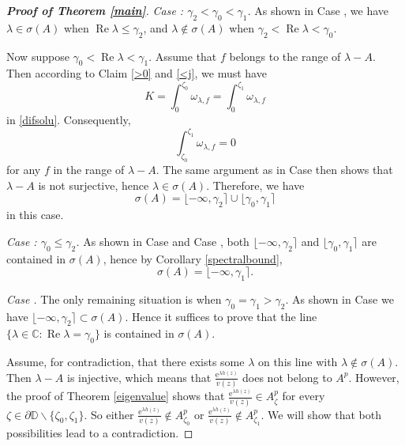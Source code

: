 \documentclass[10pt,a4paper]{amsart}
\begin{document}
\begin{proof}[\textbf{Proof of Theorem \ref{main}}]
\noindent\emph{ Case \uppercase\expandafter{}: $\gamma_2<\gamma_0<\gamma_1$.} As shown in Case \uppercase\expandafter{}, we have $\lambda\in\sigma(A)$ when $\operatorname{Re}\lambda\leq\gamma_2$, and $\lambda\notin\sigma(A)$ when $\gamma_2<\operatorname{Re}\lambda<\gamma_0$.

Now suppose $\gamma_0<\operatorname{Re}\lambda<\gamma_1$. Assume that $f$ belongs to the range of $\lambda-A$. Then according to Claim \ref{>0} and \ref{<j}, we must have
$$K=\int_0^{\zeta_0} \omega_{\lambda,f}=\int_0^{\zeta_1} \omega_{\lambda,f}$$
in \eqref{difsolu}. Consequently,
$$\int_{\zeta_0}^{\zeta_1} \omega_{\lambda,f}=0$$
for any $f$ in the range of $\lambda-A$. The same argument as in Case \uppercase\expandafter{} then shows that $\lambda-A$ is not surjective, hence $\lambda\in\sigma(A)$. Therefore, we have 
$$\sigma(A)=\lfloor-\infty, \gamma_2\rceil\cup\lfloor\gamma_0, \gamma_1\rceil$$
in this case.

 


\noindent\emph{ Case \uppercase\expandafter{}: $\gamma_0\leq\gamma_2$.} As shown in Case \uppercase\expandafter{}  and Case \uppercase\expandafter{} , both $\lfloor-\infty,\gamma_2\rceil$ and $\lfloor\gamma_0,\gamma_1\rceil$ are contained in $\sigma(A)$, hence by Corollary \ref{spectralbound}, 
$$\sigma(A)=\lfloor-\infty,\gamma_1\rceil.$$



\noindent\emph{ Case \uppercase\expandafter{}.} The only remaining situation is when $\gamma_0=\gamma_1>\gamma_2$. As shown in Case \uppercase\expandafter{} we have $\lfloor-\infty,\gamma_2\rceil\subset\sigma(A)$. Hence it suffices to prove that the line $\{\lambda\in\mathbb{C} : \operatorname{Re}\lambda=\gamma_0 \}$ is contained in $\sigma(A)$. 

Assume, for contradiction, that there exists some $\lambda$ on this line with $\lambda\notin\sigma(A)$. Then $\lambda-A$ is injective, which means that $\frac{\mathrm{e}^{\lambda h(z)}}{v(z)}$ does not belong to $A^p$. However, the proof of Theorem \ref{eigenvalue} shows that $\frac{\mathrm{e}^{\lambda h(z)}}{v(z)}\in A^p_\zeta$ for every $\zeta\in \partial \mathbb{D}\backslash\{\zeta_0, \zeta_1\}$. So either  $\frac{\mathrm{e}^{\lambda h(z)}}{v(z)}\notin A^p_{\zeta_0}$ or $\frac{\mathrm{e}^{\lambda h(z)}}{v(z)}\notin A^p_{\zeta_1}$. We will show that both possibilities lead to a contradiction.


\end{proof}
\end{document}
